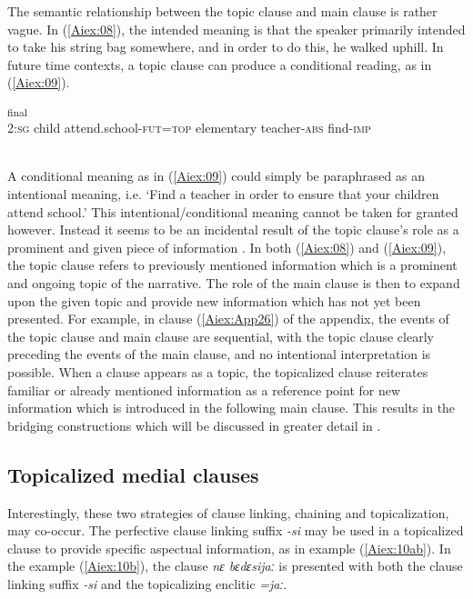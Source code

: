 \documentclass[output=paper]{LSP/langsci}
\begin{document}
The semantic relationship between the topic clause and main clause is rather vague. In (\ref{Aiex:08}), the intended meaning is that the speaker primarily intended to take his string bag somewhere, and in order to do this, he walked uphill. In future time contexts, a topic clause can produce a conditional reading, as in (\ref{Aiex:09}).

\begin{exe}
\ex \label{Aiex:09}
\textsubscript{final}\\
2:\textsc{sg}	child	attend.school-\textsc{fut}=\textsc{top}	elementary	teacher-\textsc{abs}	find-\textsc{imp}\\
\glt {}\\
\end{exe}

A conditional meaning as in (\ref{Aiex:09}) could simply be paraphrased as an intentional meaning, i.e. `Find a teacher in order to ensure that your children attend school.'
	This intentional/conditional meaning cannot be taken for granted however. Instead it seems to be an incidental result of the topic clause’s role as a prominent and given piece of information \citep{haiman.1978}. In both (\ref{Aiex:08}) and (\ref{Aiex:09}), the topic clause refers to previously mentioned information which is a prominent and ongoing topic of the narrative. The role of the main clause is then to expand upon the given topic and provide new information which has not yet been presented. For example, in clause (\ref{Aiex:App26}) of the appendix, the events of the topic clause and main clause are sequential, with the topic clause clearly preceding the events of the main clause, and no intentional interpretation is possible. When a clause appears as a topic, the topicalized clause reiterates familiar or already mentioned information as a reference point for new information which is introduced in the following main clause. This results in the bridging constructions which will be discussed in greater detail in .

\subsection{Topicalized medial clauses} 
\label{AiTopicalized.medial}
Interestingly, these two strategies of clause linking, chaining and topicalization, may co-occur. The perfective clause linking suffix \textit{-si} may be used in a topicalized clause to provide specific aspectual information, as in example (\ref{Aiex:10ab}). In the example (\ref{Aiex:10b}), the clause \textit{nɛ bɛdɛsijaː} is presented with both the clause linking suffix \textit{-si} and the topicalizing enclitic \textit{=jaː}.
\end{document}
